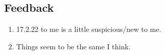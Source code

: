\documentclass[11pt]{article}
\begin{document}
\subsection*{Feedback}
\begin{enumerate}
    \item 17.2.22 to me is a little suspicious/new to me.
    \item Things seem to be the same I think.
\end{enumerate}
\end{document}
